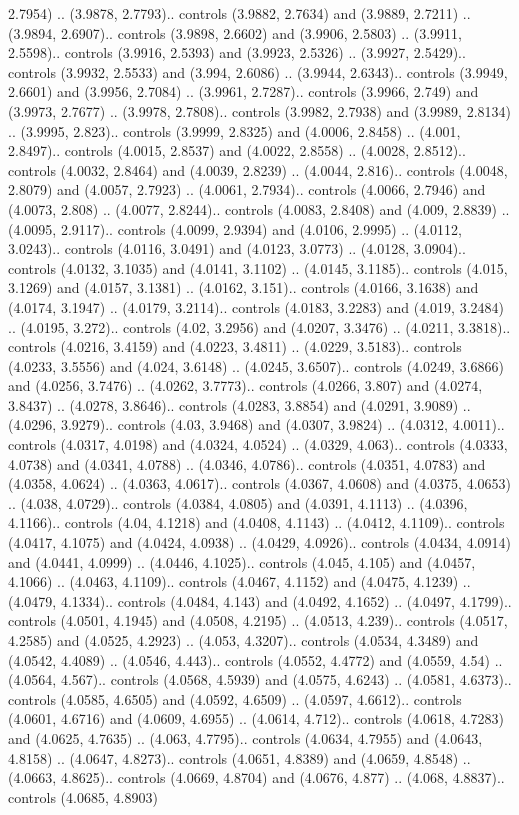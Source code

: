 2.7954) .. (3.9878, 2.7793).. controls (3.9882, 2.7634) and (3.9889, 2.7211) .. (3.9894, 2.6907).. controls (3.9898, 2.6602) and (3.9906, 2.5803) .. (3.9911, 2.5598).. controls (3.9916, 2.5393) and (3.9923, 2.5326) .. (3.9927, 2.5429).. controls (3.9932, 2.5533) and (3.994, 2.6086) .. (3.9944, 2.6343).. controls (3.9949, 2.6601) and (3.9956, 2.7084) .. (3.9961, 2.7287).. controls (3.9966, 2.749) and (3.9973, 2.7677) .. (3.9978, 2.7808).. controls (3.9982, 2.7938) and (3.9989, 2.8134) .. (3.9995, 2.823).. controls (3.9999, 2.8325) and (4.0006, 2.8458) .. (4.001, 2.8497).. controls (4.0015, 2.8537) and (4.0022, 2.8558) .. (4.0028, 2.8512).. controls (4.0032, 2.8464) and (4.0039, 2.8239) .. (4.0044, 2.816).. controls (4.0048, 2.8079) and (4.0057, 2.7923) .. (4.0061, 2.7934).. controls (4.0066, 2.7946) and (4.0073, 2.808) .. (4.0077, 2.8244).. controls (4.0083, 2.8408) and (4.009, 2.8839) .. (4.0095, 2.9117).. controls (4.0099, 2.9394) and (4.0106, 2.9995) .. (4.0112, 3.0243).. controls (4.0116, 3.0491) and (4.0123, 3.0773) .. (4.0128, 3.0904).. controls (4.0132, 3.1035) and (4.0141, 3.1102) .. (4.0145, 3.1185).. controls (4.015, 3.1269) and (4.0157, 3.1381) .. (4.0162, 3.151).. controls (4.0166, 3.1638) and (4.0174, 3.1947) .. (4.0179, 3.2114).. controls (4.0183, 3.2283) and (4.019, 3.2484) .. (4.0195, 3.272).. controls (4.02, 3.2956) and (4.0207, 3.3476) .. (4.0211, 3.3818).. controls (4.0216, 3.4159) and (4.0223, 3.4811) .. (4.0229, 3.5183).. controls (4.0233, 3.5556) and (4.024, 3.6148) .. (4.0245, 3.6507).. controls (4.0249, 3.6866) and (4.0256, 3.7476) .. (4.0262, 3.7773).. controls (4.0266, 3.807) and (4.0274, 3.8437) .. (4.0278, 3.8646).. controls (4.0283, 3.8854) and (4.0291, 3.9089) .. (4.0296, 3.9279).. controls (4.03, 3.9468) and (4.0307, 3.9824) .. (4.0312, 4.0011).. controls (4.0317, 4.0198) and (4.0324, 4.0524) .. (4.0329, 4.063).. controls (4.0333, 4.0738) and (4.0341, 4.0788) .. (4.0346, 4.0786).. controls (4.0351, 4.0783) and (4.0358, 4.0624) .. (4.0363, 4.0617).. controls (4.0367, 4.0608) and (4.0375, 4.0653) .. (4.038, 4.0729).. controls (4.0384, 4.0805) and (4.0391, 4.1113) .. (4.0396, 4.1166).. controls (4.04, 4.1218) and (4.0408, 4.1143) .. (4.0412, 4.1109).. controls (4.0417, 4.1075) and (4.0424, 4.0938) .. (4.0429, 4.0926).. controls (4.0434, 4.0914) and (4.0441, 4.0999) .. (4.0446, 4.1025).. controls (4.045, 4.105) and (4.0457, 4.1066) .. (4.0463, 4.1109).. controls (4.0467, 4.1152) and (4.0475, 4.1239) .. (4.0479, 4.1334).. controls (4.0484, 4.143) and (4.0492, 4.1652) .. (4.0497, 4.1799).. controls (4.0501, 4.1945) and (4.0508, 4.2195) .. (4.0513, 4.239).. controls (4.0517, 4.2585) and (4.0525, 4.2923) .. (4.053, 4.3207).. controls (4.0534, 4.3489) and (4.0542, 4.4089) .. (4.0546, 4.443).. controls (4.0552, 4.4772) and (4.0559, 4.54) .. (4.0564, 4.567).. controls (4.0568, 4.5939) and (4.0575, 4.6243) .. (4.0581, 4.6373).. controls (4.0585, 4.6505) and (4.0592, 4.6509) .. (4.0597, 4.6612).. controls (4.0601, 4.6716) and (4.0609, 4.6955) .. (4.0614, 4.712).. controls (4.0618, 4.7283) and (4.0625, 4.7635) .. (4.063, 4.7795).. controls (4.0634, 4.7955) and (4.0643, 4.8158) .. (4.0647, 4.8273).. controls (4.0651, 4.8389) and (4.0659, 4.8548) .. (4.0663, 4.8625).. controls (4.0669, 4.8704) and (4.0676, 4.877) .. (4.068, 4.8837).. controls (4.0685, 4.8903) 